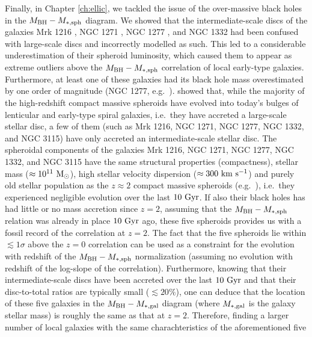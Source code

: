 Finally, in Chapter \ref{ch:ellic}, 
we tackled the issue of the over-massive black holes in the $M_{\rm BH} - M_{\rm *,sph}$ diagram. 
We showed that the intermediate-scale discs of the galaxies Mrk 1216 \citep{yildirim2015}, NGC 1271 \citep{walsh2015}, 
NGC 1277 \citep{vandenbosch2012}, and NGC 1332 \citep{rusli2011} 
had been confused with large-scale discs and incorrectly modelled as such. 
This led to a considerable underestimation of their spheroid luminosity, 
which caused them to appear as extreme outliers above the $M_{\rm BH} - M_{\rm *,sph}$ correlation 
of local early-type galaxies. 
Furthermore, at least one of these galaxies had its black hole mass overestimated by one order of magnitude 
(NGC 1277, e.g.~\citealt{Graham2016n1277}). 
\cite{gds2015} showed that, while the majority of the high-redshift compact massive spheroids 
have evolved into today's bulges of lenticular and early-type spiral galaxies, 
i.e.~they have accreted a large-scale stellar disc, 
a few of them (such as Mrk 1216, NGC 1271, NGC 1277, NGC 1332, and NGC 3115) 
have only accreted an intermediate-scale stellar disc. 
The spheroidal components of the galaxies Mrk 1216, NGC 1271, NGC 1277, NGC 1332, and NGC 3115 
have the same structural properties (compactness), stellar mass ($\approx 10^{11} \rm~M_\odot$), 
high stellar velocity dispersion ($\approx 300 \rm~km~s^{-1}$) and purely old stellar population 
as the $z \approx 2$ compact massive spheroids (e.g.~\citealt{daddi2005,trujillo2006,vandokkum2008,damjanov2009}), 
i.e.~they experienced negligible evolution over the last $10 \rm~Gyr$. 
If also their black holes has had little or no mass accretion since $z = 2$, 
assuming that the $M_{\rm BH} - M_{\rm *,sph}$ relation was already in place $10 \rm~Gyr$ ago, 
these five spheroids provides us with a fossil record of the correlation at $z=2$. 
The fact that the five spheroids lie within $\lesssim 1\sigma$ above the $z=0$ correlation 
can be used as a constraint for the evolution with redshift of the $M_{\rm BH} - M_{\rm *,sph}$ normalization 
(assuming no evolution with redshift of the log-slope of the correlation). 
Furthermore, knowing that their intermediate-scale discs have been accreted over the last $10 \rm~Gyr$ 
and that their disc-to-total ratios are typically small ($\lesssim 20\%$), 
one can deduce that the location of these five galaxies in the $M_{\rm BH} - M_{\rm *,gal}$ diagram 
(where $M_{\rm *,gal}$ is the galaxy stellar mass) 
is roughly the same as that at $z=2$. 
Therefore, finding a larger number of local galaxies with the same charachteristics of the aforementioned five 
